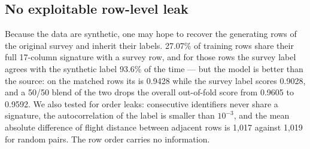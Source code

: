 \subsection{No exploitable row-level leak}
\label{sec:leak}
Because the data are synthetic, one may hope to recover the generating rows of the original
survey and inherit their labels. 27.07\% of training rows share their full 17-column signature
with a survey row, and for those rows the survey label agrees with the synthetic label 93.6\%
of the time --- but the model is better than the source: on the matched rows its \auc{} is
0.9428 while the survey label scores 0.9028, and a 50/50 blend of the two drops the overall
out-of-fold score from 0.9605 to 0.9592. We also tested for order leaks: consecutive identifiers
never share a signature, the autocorrelation of the label is smaller than $10^{-3}$, and the
mean absolute difference of flight distance between adjacent rows is 1{,}017 against 1{,}019 for
random pairs. The row order carries no information.
